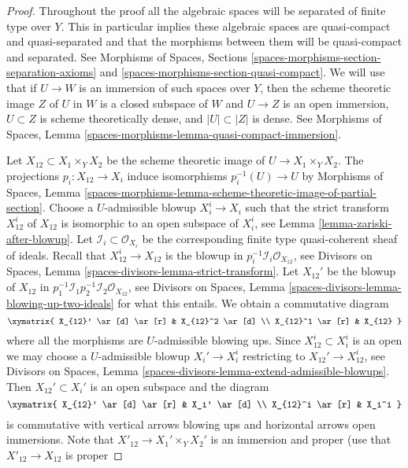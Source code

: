 \begin{proof}
Throughout the proof all the algebraic spaces will be separated of finite
type over $Y$. This in particular implies these algebraic spaces are
quasi-compact and quasi-separated and that the morphisms between them
will be quasi-compact and separated. See
Morphisms of Spaces, Sections
\ref{spaces-morphisms-section-separation-axioms} and
\ref{spaces-morphisms-section-quasi-compact}.
We will use that if $U \to W$ is an immersion of such spaces over $Y$,
then the scheme theoretic image $Z$ of $U$ in $W$ is a closed subspace
of $W$ and $U \to Z$ is an open immersion, $U \subset Z$ is scheme
theoretically dense, and $|U| \subset |Z|$ is dense. See
Morphisms of Spaces, Lemma
\ref{spaces-morphisms-lemma-quasi-compact-immersion}.

\medskip\noindent
Let $X_{12} \subset X_1 \times_Y X_2$ be the scheme theoretic image
of $U \to X_1 \times_Y X_2$. The projections $p_i : X_{12} \to X_i$
induce isomorphisms $p_i^{-1}(U) \to U$ by
Morphisms of Spaces, Lemma
\ref{spaces-morphisms-lemma-scheme-theoretic-image-of-partial-section}.
Choose a $U$-admissible blowup $X_i^i \to X_i$ such that
the strict transform $X_{12}^i$ of $X_{12}$ is isomorphic to an
open subspace of $X_i^i$, see
Lemma \ref{lemma-zariski-after-blowup}.
Let $\mathcal{I}_i \subset \mathcal{O}_{X_i}$ be the corresponding
finite type quasi-coherent sheaf of ideals.
Recall that $X_{12}^i \to X_{12}$ is the blowup in
$p_i^{-1}\mathcal{I}_i \mathcal{O}_{X_{12}}$, see
Divisors on Spaces, Lemma \ref{spaces-divisors-lemma-strict-transform}.
Let $X_{12}'$ be the blowup of $X_{12}$ in
$p_1^{-1}\mathcal{I}_1 p_2^{-1}\mathcal{I}_2 \mathcal{O}_{X_{12}}$, see
Divisors on Spaces, Lemma \ref{spaces-divisors-lemma-blowing-up-two-ideals}
for what this entails. We obtain a commutative diagram
$$
\xymatrix{
X_{12}' \ar[d] \ar[r] & X_{12}^2 \ar[d] \\
X_{12}^1 \ar[r] & X_{12}
}
$$
where all the morphisms are $U$-admissible blowing ups. Since
$X_{12}^i \subset X_i^i$ is an open we may choose a $U$-admissible blowup
$X_i' \to X_i^i$ restricting to $X_{12}' \to X_{12}^i$, see
Divisors on Spaces, Lemma
\ref{spaces-divisors-lemma-extend-admissible-blowups}.
Then $X_{12}' \subset X_i'$ is an open subspace and the diagram
$$
\xymatrix{
X_{12}' \ar[d] \ar[r] & X_i' \ar[d] \\
X_{12}^i \ar[r] & X_i^i
}
$$
is commutative with vertical arrows blowing ups and horizontal arrows
open immersions. Note that $X'_{12} \to X_1' \times_Y X_2'$ is
an immersion and proper (use that $X'_{12} \to X_{12}$ is proper

\end{proof}
